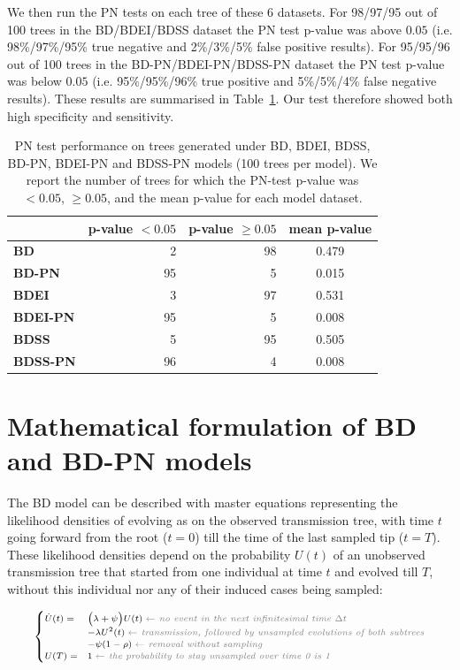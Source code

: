 \documentclass[a4paper,10pt]{article}
\begin{document}
We then run the PN tests on each tree of these 6 datasets. For 98/97/95 out of 100 trees in the BD/BDEI/BDSS dataset the PN test p-value was above $0.05$ (i.e. 98\%/97\%/95\% true negative and 2\%/3\%/5\% false positive results). For 95/95/96 out of 100 trees in the BD-PN/BDEI-PN/BDSS-PN dataset the PN test p-value was below $0.05$ (i.e. 95\%/95\%/96\% true positive and 5\%/5\%/4\% false negative results). These results are summarised in Table~\ref{tbl:pntest}. Our test therefore showed both high specificity and sensitivity.

\begin{table}[!h]\centering
\small
\caption{PN test performance on trees generated under BD, BDEI, BDSS, BD-PN, BDEI-PN and BDSS-PN models (100 trees per model). We report the number of trees for which the PN-test p-value was $<0.05$, $\geq 0.05$, and the mean p-value for each model dataset.}
\begin{tabular}{l|r|r|c}
 & \textbf{p-value $<0.05$} & \textbf{p-value $\geq0.05$} & \textbf{mean p-value} \\
  \midrule
\textbf{BD}& 2 & 98 & 0.479 \\
\textbf{BD-PN}& 95 & 5 & 0.015 \\
  \midrule
\textbf{BDEI}& 3 & 97 & 0.531 \\
\textbf{BDEI-PN}& 95 & 5 & 0.008 \\
  \midrule
\textbf{BDSS}& 5 & 95 & 0.505 \\
\textbf{BDSS-PN}& 96 & 4 & 0.008 \\
\end{tabular}
\label{tbl:pntest}
\end{table}
 

\section{Mathematical formulation of BD and BD-PN models}\label{math}

The BD model can be described with master equations representing the likelihood densities of evolving as on the observed transmission tree, with time $t$ going forward from the root ($t=0$) till the time of the last sampled tip ($t=T$). These likelihood densities depend on the probability $U(t)$ of an unobserved transmission tree that started from one individual at time $t$ and evolved till $T$, without this individual nor any of their induced cases being sampled: 

\begin{equation}
\scriptsize
\begin{cases}
\dot{U}(t) = &\Big(\lambda + \psi\Big) U(t)\; \textit{\color{gray} $\leftarrow$ no event in the next infinitesimal time $\Delta t$ }\\
    &- \lambda U^2(t) \;  \textit{\color{gray} $\leftarrow$ transmission, followed by unsampled evolutions of both subtrees}\\
    &- \psi (1 - \rho)\;  \textit{\color{gray} $\leftarrow$ removal without sampling}\\
U(T) = & 1\;  \textit{\color{gray} $\leftarrow$ the probability to stay unsampled over time 0 is 1} \label{eq:Us}
\end{cases}
\end{equation}
\end{document}

